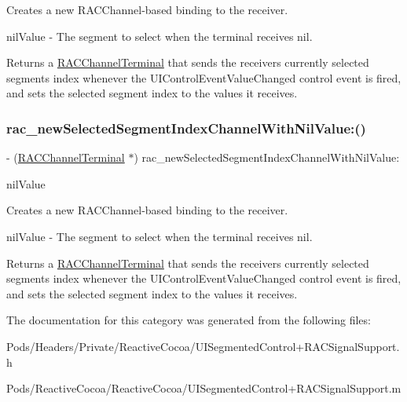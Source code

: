 Creates a new R\+A\+C\+Channel-\/based binding to the receiver.

nil\+Value -\/ The segment to select when the terminal receives {\ttfamily nil}.

Returns a \mbox{\hyperlink{interface_r_a_c_channel_terminal}{R\+A\+C\+Channel\+Terminal}} that sends the receiver\textquotesingle{}s currently selected segment\textquotesingle{}s index whenever the U\+I\+Control\+Event\+Value\+Changed control event is fired, and sets the selected segment index to the values it receives. \mbox{\label{category_u_i_segmented_control_07_r_a_c_signal_support_08_a94173e77e84791dae3e950b9c7b06bca}} 
\subsubsection{\texorpdfstring{rac\+\_\+new\+Selected\+Segment\+Index\+Channel\+With\+Nil\+Value\+:()}{rac\_newSelectedSegmentIndexChannelWithNilValue:()}\hspace{0.1cm}{\footnotesize\ttfamily [3/3]}}
{\footnotesize\ttfamily -\/ (\mbox{\hyperlink{interface_r_a_c_channel_terminal}{R\+A\+C\+Channel\+Terminal}} $\ast$) rac\+\_\+new\+Selected\+Segment\+Index\+Channel\+With\+Nil\+Value\+: \begin{DoxyParamCaption}\item[{(N\+S\+Number $\ast$)}]{nil\+Value }\end{DoxyParamCaption}}

Creates a new R\+A\+C\+Channel-\/based binding to the receiver.

nil\+Value -\/ The segment to select when the terminal receives {\ttfamily nil}.

Returns a \mbox{\hyperlink{interface_r_a_c_channel_terminal}{R\+A\+C\+Channel\+Terminal}} that sends the receiver\textquotesingle{}s currently selected segment\textquotesingle{}s index whenever the U\+I\+Control\+Event\+Value\+Changed control event is fired, and sets the selected segment index to the values it receives. 

The documentation for this category was generated from the following files\+:\begin{DoxyCompactItemize}
\item 
Pods/\+Headers/\+Private/\+Reactive\+Cocoa/U\+I\+Segmented\+Control+\+R\+A\+C\+Signal\+Support.\+h\item 
Pods/\+Reactive\+Cocoa/\+Reactive\+Cocoa/U\+I\+Segmented\+Control+\+R\+A\+C\+Signal\+Support.\+m\end{DoxyCompactItemize}
